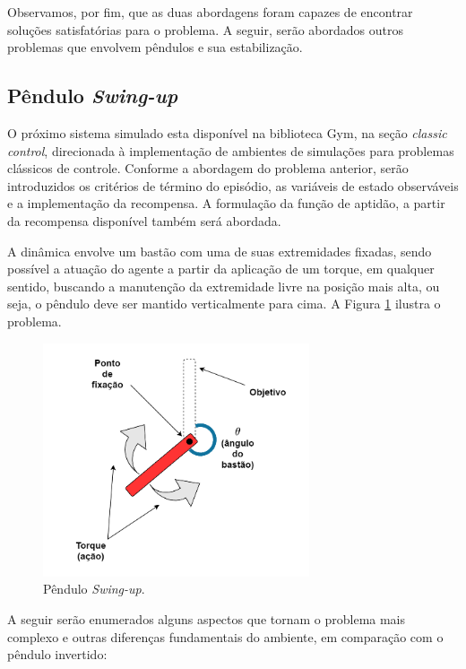 Observamos, por fim, que as duas abordagens foram capazes de encontrar soluções satisfatórias para o problema. A seguir, serão abordados outros problemas que envolvem pêndulos e sua estabilização. 

\subsection{Pêndulo \textit{Swing-up}}\label{ssec:4ec-pendulum}

O próximo sistema simulado esta disponível na biblioteca Gym, na seção \textit{classic control}, direcionada à implementação de ambientes de simulações para problemas clássicos de controle. Conforme a abordagem do problema anterior, serão introduzidos os critérios de término do episódio, as variáveis de estado observáveis e a implementação da recompensa. A formulação da função de aptidão, a partir da recompensa disponível também será abordada.

A dinâmica envolve um bastão com uma de suas extremidades fixadas, sendo possível a atuação do agente a partir da aplicação de um torque, em qualquer sentido, buscando a manutenção da extremidade livre na posição mais alta, ou seja, o pêndulo deve ser mantido verticalmente para cima. A Figura \ref{fig:4ec-pendulumenv} ilustra o problema.

\begin{figure}[H]
	\centering
	\includegraphics[width=0.7\textwidth]{02_desenvolvimento/04_EC_Fig_PendulumEnv2.png}
	\caption{Pêndulo \textit{Swing-up}.}
	\label{fig:4ec-pendulumenv}
\end{figure}

A seguir serão enumerados alguns aspectos que tornam o problema mais complexo e outras diferenças fundamentais do ambiente, em comparação com o pêndulo invertido:

